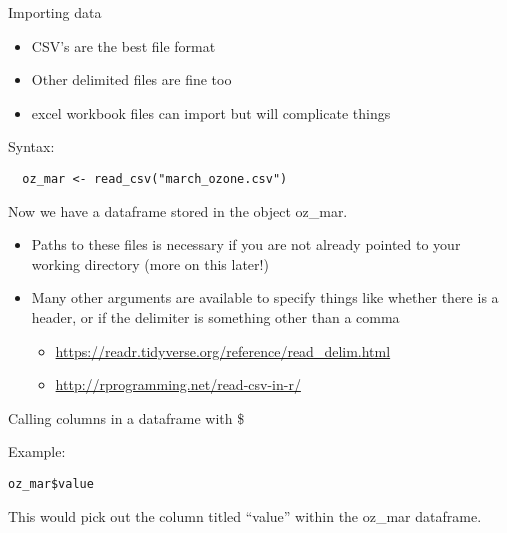 \documentclass[ignorenonframetext,]{beamer}
\providecommand{\tightlist}{%
  \setlength{\itemsep}{0pt}\setlength{\parskip}{0pt}}
\begin{document}
\begin{frame}[fragile]{Importing data}

\begin{itemize}
\tightlist
\item
  CSV's are the best file format
\item
  Other delimited files are fine too
\item
  excel workbook files can import but will complicate things
\end{itemize}

Syntax:

\begin{verbatim}
  oz_mar <- read_csv("march_ozone.csv")
\end{verbatim}

Now we have a dataframe stored in the object oz\_mar.

\begin{itemize}
\tightlist
\item
  Paths to these files is necessary if you are not already pointed to
  your working directory (more on this later!)
\item
  Many other arguments are available to specify things like whether
  there is a header, or if the delimiter is something other than a comma

  \begin{itemize}
  \tightlist
  \item
    \url{https://readr.tidyverse.org/reference/read_delim.html}
  \item
    \url{http://rprogramming.net/read-csv-in-r/}
  \end{itemize}
\end{itemize}

\end{frame}

\begin{frame}[fragile]{Calling columns in a dataframe with \$}

Example:

\begin{verbatim}
oz_mar$value
\end{verbatim}

This would pick out the column titled ``value'' within the oz\_mar
dataframe.

\end{frame}
\end{document}
